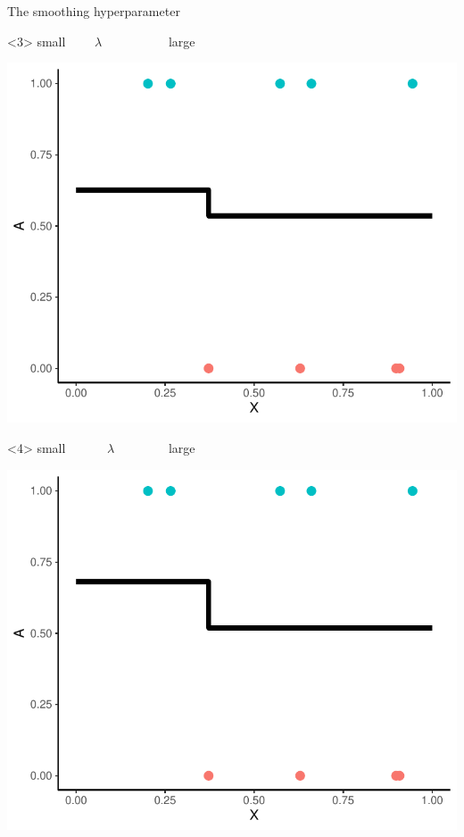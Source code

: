 \documentclass[smaller]{beamer}\usepackage{listings}
\begin{document}
\begin{frame}[label={sec:org990e36d}]{The smoothing hyperparameter}
\begin{onlyenv}<3>
\center small \(\quad \quad \lambda \quad \quad \quad \quad \quad\) large

\begin{center}
\includegraphics[width=.9\linewidth]{./hal-smoothing1.pdf}
\end{center}
\end{onlyenv}

\begin{onlyenv}<4>
\center small \(\quad \quad \quad  \lambda \quad \quad \quad \quad\) large

\begin{center}
\includegraphics[width=.9\linewidth]{./hal-smoothing2.pdf}
\end{center}
\end{onlyenv}


\end{frame}
\end{document}
